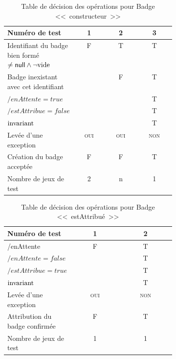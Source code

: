 \documentclass[11pt,article]{article}
\newcommand{\nullvalue}{\textsf{null}\xspace}
\newcommand{\emptyvalue}{\ensuremath\mathrm{vide}}
\newcommand{\invariant}{\ensuremath\mathrm{invariant}}
\begin{document}
\begin{table}[!ht]
\begin{center}
\begin{tabular}{|p{0.4\linewidth}|c|c|c|}
\hline
Numéro de test
&1&2&3\\
\hline
\hline
Identifiant du badge bien formé $\neq \nullvalue \land \neg \emptyvalue$
&F&T&T\\
\hline
Badge inexistant avec cet identifiant
& &F&T\\
\hline
\hline
$/enAttente = true$
& & &T\\
\hline
$/estAttribue = false$
& & &T\\
\hline
$\invariant$
& & &T\\
\hline
Levée d'une exception&\textsc{oui}&\textsc{oui}&\textsc{non}\\
\hline
\hline
Création du badge acceptée
&F&F&T\\
\hline
\hline
Nombre de jeux de test
&2&n&1\\
\hline
\end{tabular}
\end{center}
\caption{Table de décision des opérations pour Badge <<~constructeur~>>}
\end{table}

\begin{table}[!ht]
\begin{center}
\begin{tabular}{|p{0.4\linewidth}|c|c|}
\hline
Numéro de test
&1&2\\
\hline
\hline
/enAttente
&F&T\\
\hline
\hline
$/enAttente = false$
& &T\\
\hline
$/estAttribue = true$
& &T\\
\hline
$\invariant$
& &T\\
\hline
Levée d'une exception&\textsc{oui}&\textsc{non}\\
\hline
\hline
Attribution du badge confirmée
&F&T\\
\hline
\hline
Nombre de jeux de test
&1&1\\
\hline
\end{tabular}
\end{center}
\caption{Table de décision des opérations pour Badge <<~estAttribué~>>}
\end{table}
\end{document}
